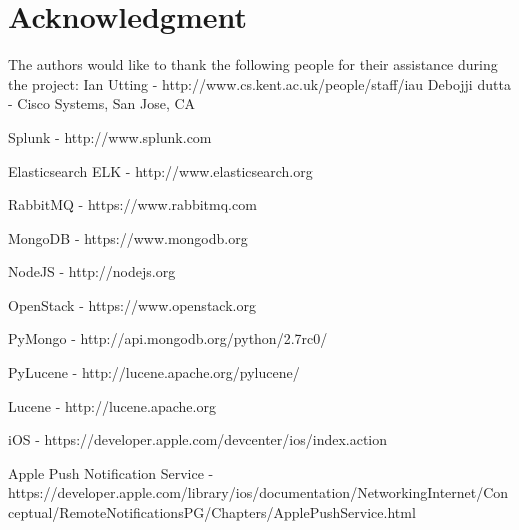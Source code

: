 \documentclass[10pt, a4paper, conference, compsocconf]{IEEEtran}
\begin{document}





\section*{Acknowledgment}
The authors would like to thank the following people for their assistance during the project:
Ian Utting - http://www.cs.kent.ac.uk/people/staff/iau
Debojji dutta - Cisco Systems, San Jose, CA



%
%
%
\begin{thebibliography}{1}

    Splunk - http://www.splunk.com

    Elasticsearch ELK - http://www.elasticsearch.org

    RabbitMQ - https://www.rabbitmq.com

    MongoDB - https://www.mongodb.org

    NodeJS - http://nodejs.org

    OpenStack - https://www.openstack.org

    PyMongo - http://api.mongodb.org/python/2.7rc0/

    PyLucene - http://lucene.apache.org/pylucene/

    Lucene - http://lucene.apache.org

    iOS - https://developer.apple.com/devcenter/ios/index.action

    Apple Push Notification Service - https://developer.apple.com/library/ios/documentation/NetworkingInternet/Conceptual/RemoteNotificationsPG/Chapters/ApplePushService.html

\end{thebibliography}

\end{document}
